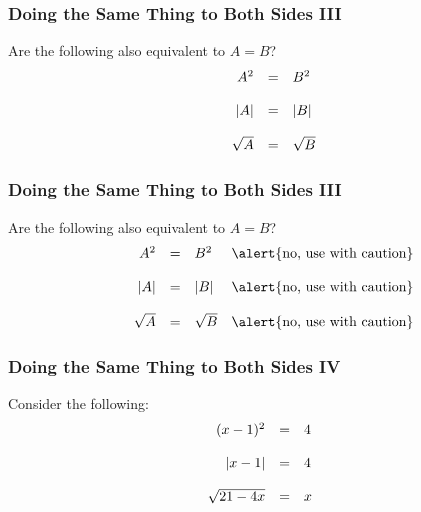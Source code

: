\documentclass[xcolor=dvipsnames]{beamer}
\begin{document}
\begin{frame}
  \frametitle{Doing the Same Thing to Both Sides III}
Are the following also equivalent to $A=B$?
\begin{equation}
  \label{eq:uozingei}
  \begin{array}{rcl}
    A^{2}&=&B^{2} \\
\hspace{.5in} && \\
    |A|&=&|B| \\
\hspace{.5in} && \\
    \sqrt{A}&=&\sqrt{B}
  \end{array}
\end{equation}
\end{frame}

\begin{frame}
  \frametitle{Doing the Same Thing to Both Sides III}
Are the following also equivalent to $A=B$?
\begin{equation}
  \label{eq:upohngee}
  \begin{array}{rcll}
    A^{2}&=&B^{2}&\alert{\mbox{no, use with caution}} \\
\hspace{.5in} &&& \\
    |A|&=&|B|&\alert{\mbox{no, use with caution}} \\
\hspace{.5in} &&& \\
    \sqrt{A}&=&\sqrt{B}&\alert{\mbox{no, use with caution}}
  \end{array}
\end{equation}
\end{frame}

\begin{frame}
  \frametitle{Doing the Same Thing to Both Sides IV}
Consider the following:
\begin{equation}
  \label{eq:oopiesho}
  \begin{array}{rcl}
    (x-1)^{2}&=&4 \\
\hspace{.5in} && \\
    |x-1|&=&4 \\
\hspace{.5in} && \\
    \sqrt{21-4x}&=&x
  \end{array}
\end{equation}
\end{frame}
\end{document}

